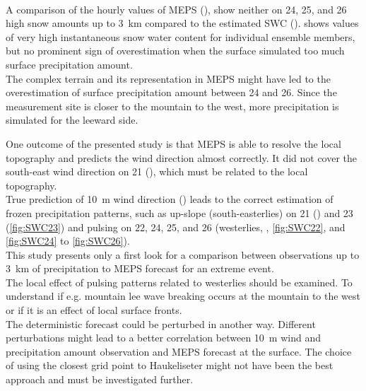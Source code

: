 \\
A comparison of the hourly values of MEPS (), show neither on \num{24}, \num{25}, and \SI{26}{\dec} high snow amounts up to \SI{3}{\km} compared to the estimated SWC ().  shows values of very high instantaneous snow water content for individual ensemble members, but no prominent sign of overestimation when the surface %
simulated too much surface precipitation amount.
\\
The complex terrain and its representation in MEPS might have led to the overestimation of surface precipitation amount between \num{24} and \SI{26}{\dec}. Since the measurement site is closer to the mountain to the west, more precipitation is simulated for the leeward side.
\par\medskip\noindent
One outcome of the presented study is that MEPS is able to resolve the local topography and predicts the wind direction almost correctly.  It did not cover the south-east wind direction on \SI{21}{\dec} (), which must be related to the local topography. 
\\
True prediction of \SI{10}{\metre} wind direction () leads to the correct estimation of frozen precipitation patterns, such as up-slope (south-easterlies) on \num{21} () and \SI{23}{\dec} (\ref{fig:SWC23}) and pulsing on \num{22}, \num{24}, \num{25}, and \SI{26}{\dec} (westerlies, , \ref{fig:SWC22}, and \ref{fig:SWC24} to \ref{fig:SWC26}). 
\\
This study presents only a first look for a comparison between observations up to \SI{3}{\km} of precipitation to MEPS forecast for an extreme event. 
\\
The local effect of pulsing patterns related to westerlies should be examined. To understand if e.g. mountain lee wave breaking occurs at the mountain to the west or if it is an effect of local surface fronts. 
\\
The deterministic forecast could be perturbed in another way. 
Different perturbations might lead to a better correlation between \SI{10}{\metre} wind and precipitation amount observation and MEPS forecast at the surface. %
The choice of using the closest grid point to Haukeliseter might not have been the best approach and must be investigated further. %
